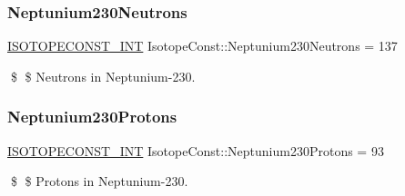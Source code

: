 \subsubsection{\texorpdfstring{Neptunium230\+Neutrons}{Neptunium230Neutrons}}
{\footnotesize\ttfamily \mbox{\hyperlink{group___isotope_const-_macros_ga5f18360b3e99483a35c32d789e62621c}{I\+S\+O\+T\+O\+P\+E\+C\+O\+N\+S\+T\+\_\+\+I\+NT}} Isotope\+Const\+::\+Neptunium230\+Neutrons = 137}

\$ \$ Neutrons in Neptunium-\/230. \mbox{\label{group___isotope_const-_neptunium-_np230_ga06b138f75423f81dc9ef20cd0afc4190}} 
\subsubsection{\texorpdfstring{Neptunium230\+Protons}{Neptunium230Protons}}
{\footnotesize\ttfamily \mbox{\hyperlink{group___isotope_const-_macros_ga5f18360b3e99483a35c32d789e62621c}{I\+S\+O\+T\+O\+P\+E\+C\+O\+N\+S\+T\+\_\+\+I\+NT}} Isotope\+Const\+::\+Neptunium230\+Protons = 93}

\$ \$ Protons in Neptunium-\/230. 